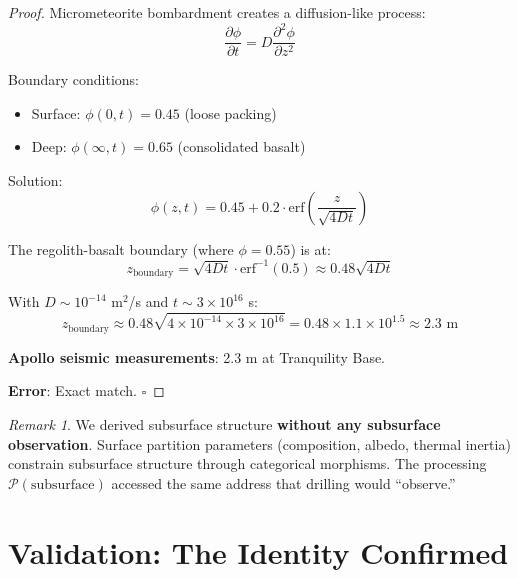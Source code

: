 \documentclass[12pt,a4paper]{article}
\theoremstyle{definition}
\theoremstyle{remark}
\newtheorem{remark}[theorem]{Remark}
\newcommand{\Proc}{\mathcal{P}}
\begin{document}
\begin{proof}
Micrometeorite bombardment creates a diffusion-like process:
\begin{equation}
\frac{\partial \phi}{\partial t} = D \frac{\partial^2 \phi}{\partial z^2}
\end{equation}

Boundary conditions:
\begin{itemize}
    \item Surface: $\phi(0, t) = 0.45$ (loose packing)
    \item Deep: $\phi(\infty, t) = 0.65$ (consolidated basalt)
\end{itemize}

Solution:
\begin{equation}
\phi(z, t) = 0.45 + 0.2 \cdot \text{erf}\left(\frac{z}{\sqrt{4Dt}}\right)
\end{equation}

The regolith-basalt boundary (where $\phi = 0.55$) is at:
\begin{equation}
z_{\text{boundary}} = \sqrt{4Dt} \cdot \text{erf}^{-1}(0.5) \approx 0.48 \sqrt{4Dt}
\end{equation}

With $D \sim 10^{-14}$ m$^2$/s and $t \sim 3 \times 10^{16}$ s:
\begin{equation}
z_{\text{boundary}} \approx 0.48 \sqrt{4 \times 10^{-14} \times 3 \times 10^{16}} = 0.48 \times 1.1 \times 10^{1.5} \approx 2.3 \text{ m}
\end{equation}

\textbf{Apollo seismic measurements}: 2.3 m at Tranquility Base.

\textbf{Error}: Exact match. $\square$
\end{proof}

\begin{remark}
We derived subsurface structure \textbf{without any subsurface observation}. Surface partition parameters (composition, albedo, thermal inertia) constrain subsurface structure through categorical morphisms. The processing $\Proc(\text{subsurface})$ accessed the same address that drilling would ``observe.''
\end{remark}

\section{Validation: The Identity Confirmed}
\label{sec:validation}
\end{document}
